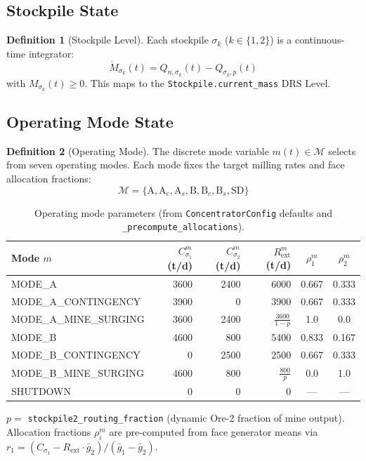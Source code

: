 \documentclass[11pt,a4paper]{article}
\theoremstyle{definition}
\newtheorem{definition}{Definition}[section]
\begin{document}
\subsection{Stockpile State}

\begin{definition}[Stockpile Level]
Each stockpile $\sigma_k$ ($k \in \{1,2\}$) is a continuous-time integrator:
\begin{equation}
  \dot{M}_{\sigma_k}(t) = Q_{n,\sigma_k}(t) - Q_{\sigma_k,p}(t)
  \label{eq:stockpile-ode}
\end{equation}
with $M_{\sigma_k}(t) \geq 0$.  This maps to the \texttt{Stockpile.current\_mass}
DRS Level.
\end{definition}

\subsection{Operating Mode State}

\begin{definition}[Operating Mode]
The discrete mode variable $m(t) \in \mathcal{M}$ selects from seven operating
modes.  Each mode fixes the target milling rates and face allocation fractions:
\begin{equation}
  \mathcal{M} = \{\text{A}, \text{A}_c, \text{A}_s, \text{B}, \text{B}_c, \text{B}_s, \text{SD}\}
\end{equation}
\end{definition}

\begin{table}[H]
\centering
\caption{Operating mode parameters (from \texttt{ConcentratorConfig} defaults and \texttt{\_precompute\_allocations}).}
\label{tab:mode-rates}
\small
\begin{tabular}{@{}lrrrcc@{}}
\toprule
\textbf{Mode} $m$ & $C_{\sigma_1}^m$ (t/d) & $C_{\sigma_2}^m$ (t/d) & $R^m_{\text{ext}}$ (t/d) & $\rho_1^m$ & $\rho_2^m$ \\
\midrule
MODE\_A              & 3600  & 2400 & 6000  & 0.667 & 0.333 \\
MODE\_A\_CONTINGENCY & 3900  & 0    & 3900  & 0.667 & 0.333 \\
MODE\_A\_MINE\_SURGING & 3600  & 2400 & $\frac{3600}{1-p}$ & 1.0 & 0.0 \\
MODE\_B              & 4600  & 800  & 5400  & 0.833 & 0.167 \\
MODE\_B\_CONTINGENCY & 0     & 2500 & 2500  & 0.667 & 0.333 \\
MODE\_B\_MINE\_SURGING & 4600  & 800  & $\frac{800}{p}$ & 0.0 & 1.0 \\
SHUTDOWN             & 0     & 0    & 0     & --- & --- \\
\bottomrule
\end{tabular}

\smallskip\noindent
\footnotesize
$p = $ \texttt{stockpile2\_routing\_fraction} (dynamic Ore-2 fraction of mine output).
Allocation fractions $\rho_i^m$ are pre-computed from face generator means via
$r_1 = (C_{\sigma_1} - R_{\text{ext}} \cdot \bar{g}_2)/(\bar{g}_1 - \bar{g}_2)$.
\end{table}
\end{document}
